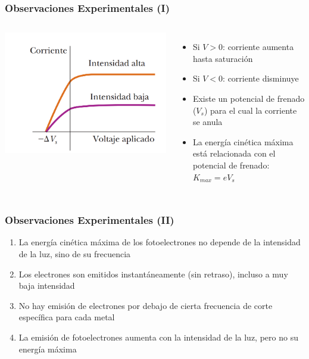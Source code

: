\documentclass{beamer}
\begin{document}
	\begin{frame}
		\frametitle{Observaciones Experimentales (I)}
		\begin{columns}
			\includegraphics[width=\textwidth]{../Imagenes/EFE_curvas.png}
			\begin{itemize}
				\item Si $V > 0$: corriente aumenta hasta saturación
				\item Si $V < 0$: corriente disminuye
				\item Existe un \alert{potencial de frenado} ($V_s$) para el cual la corriente se anula
				\item La energía cinética máxima está relacionada con el potencial de frenado: $K_{max} = eV_s$
			\end{itemize}
		\end{columns}
	\end{frame}
	
	\begin{frame}
		\frametitle{Observaciones Experimentales (II)}
		
		\begin{enumerate}
			\item La energía cinética máxima de los fotoelectrones \alert{no depende de la intensidad} de la luz, sino de su \alert{frecuencia}
			\item Los electrones son emitidos instantáneamente (sin retraso), incluso a muy baja intensidad
			\item No hay emisión de electrones por debajo de cierta \alert{frecuencia de corte} específica para cada metal
			\item La emisión de fotoelectrones aumenta con la intensidad de la luz, pero no su energía máxima
		\end{enumerate}
		
	\end{frame}
	
\end{document}
